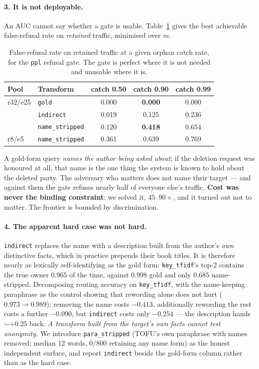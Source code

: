 \documentclass[11pt]{article}
\begin{document}
\paragraph{3. It is not deployable.} An AUC cannot say whether a gate is usable. Table~\ref{tab:fpr}
gives the best achievable false-refusal rate on \emph{retained} traffic, minimised over $m$.

\begin{table}[t]
\centering
\begin{tabular}{@{}llccc@{}}
\toprule
Pool & Transform & catch 0.50 & catch 0.90 & catch 0.99 \\
\midrule
r32/e25 & \texttt{gold}            & 0.000 & \textbf{0.000} & 0.000 \\
        & \texttt{indirect}        & 0.019 & 0.125 & 0.236 \\
        & \texttt{name\_stripped}  & 0.120 & \textbf{0.418} & 0.654 \\
r8/e5   & \texttt{name\_stripped}  & 0.361 & 0.639 & 0.769 \\
\bottomrule
\end{tabular}
\caption{False-refusal rate on retained traffic at a given orphan catch rate, for the \texttt{ppl}
refusal gate. The gate is perfect where it is not needed and unusable where it is.}
\label{tab:fpr}
\end{table}

A gold-form query \emph{names the author being asked about}; if the deletion request was honoured at
all, that name is the one thing the system is known to hold about the deleted party. The adversary
who matters does not name their target --- and against them the gate refuses nearly half of everyone
else's traffic. \textbf{Cost was never the binding constraint}: we solved it, $45$--$90\times$, and
it turned out not to matter. The frontier is bounded by discrimination.

\paragraph{4. The apparent hard case was not hard.}
\label{sec:indirect}
\texttt{indirect} replaces the name with a description built from the author's \emph{own}
distinctive facts, which in practice prepends their book titles. It is therefore nearly as
lexically self-identifying as the gold form: \texttt{key\_tfidf}'s top-2 contains the true owner
$0.965$ of the time, against $0.998$ gold and only $0.685$ name-stripped. Decomposing routing
accuracy on \texttt{key\_tfidf}, with the name-keeping paraphrase as the control showing that
rewording alone does not hurt ($0.973 \to 0.989$): removing the name costs $-0.413$, additionally
rewording the rest costs a further $-0.090$, but \texttt{indirect} costs only $-0.254$ --- the
description hands ${\sim}{+}0.25$ back. \emph{A transform built from the target's own facts cannot
test anonymity.} We introduce \texttt{para\_stripped} (TOFU's own paraphrase with names removed;
median 12 words, $0/800$ retaining any name form) as the honest independent surface, and report
\texttt{indirect} beside the gold-form column rather than as the hard case.
\end{document}

